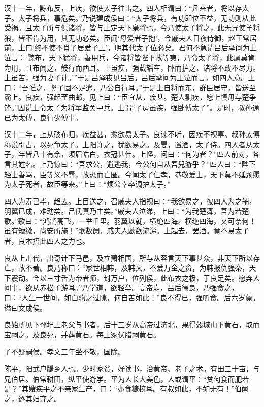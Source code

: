 \documentclass[12pt,UTF8]{ctexbook}
\begin{document}
汉十一年，黥布反，上疾，欲使太子往击之。四人相谓曰：“凡来者，将以存太子。太子将兵，事危矣。”乃说建成侯曰：“太子将兵，有功即位不益，无功则从此受祸。且太子所与俱诸将，皆与上定天下枭将也，今乃使太子将之，此无异使羊将狼，皆不肯为用，其无功必矣。臣闻‘母爱者子抱’，今戚夫人日夜侍御，赵王常居前，上曰‘终不使不肖子居爱子上’，明其代太子位必矣。君何不急请吕后承间为上泣言：‘黥布，天下猛将，善用兵，今诸将皆陛下故等夷，乃令太子将，此属莫肯为用，且布闻之，鼓行而西耳。上虽疾，强载辎车，卧而护之，诸将不敢不尽力。上虽苦，强为妻子计。’”于是吕泽夜见吕后。吕后承间为上泣而言，如四人意。上曰：“吾惟之，竖子固不足遣，乃公自行耳。”于是上自将而东，群臣居守，皆送至霸上。良疾，强起至曲邮，见上曰：“臣宜从，疾甚。楚人剽疾，愿上慎毋与楚争锋。”因说上令太子为将军监关中兵。上谓“子房虽疾，强卧傅太子”。是时，叔孙通已为太傅，良行少傅事。



汉十二年，上从破布归，疾益甚，愈欲易太子。良谏不听，因疾不视事。叔孙太傅称说引古，以死争太子。上阳许之，犹欲易之。及晏，置酒，太子侍。四人者从太子，年皆八十有余，须眉皓白，衣冠甚伟。上怪，问曰：“何为者？”四人前对，各言其姓名。上乃惊曰：“吾求公，避逃我，今公何自从吾兒游乎？”四人曰：“陛下轻士善骂，臣等义不辱，故恐而亡匿。今闻太子仁孝，恭敬爱士，天下莫不延颈愿为太子死者，故臣等来。”上曰：“烦公幸卒调护太子。”



四人为寿已毕，趋去。上目送之，召戚夫人指视曰：“我欲易之，彼四人为之辅，羽翼已成，难动矣。吕氏真乃主矣。”戚夫人泣涕，上曰：“为我楚舞，吾为若楚歌。”歌曰：“鸿鹄高飞，一举千里。羽翼以就，横绝四海。横绝四海，又可奈何！虽有矰缴，尚安所施！”歌数阕，戚夫人歔欷流涕。上起去，罢酒。竟不易太子者，良本招此四人之力也。



良从上击代，出奇计下马邑，及立萧相国，所与从容言天下事甚众，非天下所以存亡，故不著。良乃称曰：“家世相韩，及韩灭，不爱万金之资，为韩报仇强秦，天下震动。今以三寸舌为帝者师，封万户，位列侯，此布衣之极，于良足矣。愿弃人间事，欲从赤松子游耳。”乃学道，欲轻举。高帝崩，吕后德良，乃强食之，曰：“人生一世间，如白驹之过隙，何自苦如此！”良不得已，强听食。后六岁薨。谥曰文成侯。



良始所见下邳圯上老父与书者，后十三岁从高帝过济北，果得穀城山下黄石，取而宝祠之。及良死，并葬黄石。每上冢伏腊祠黄石。



子不疑嗣侯。孝文三年坐不敬，国除。



陈平，阳武户牖乡人也。少时家贫，好读书，治黄帝、老子之术。有田三十亩，与兄伯居。伯常耕田，纵平使游学。平为人长大美色，人或谓平：“贫何食而肥若是？”其嫂疾平之不亲家生产，曰：“亦食糠核耳。有叔如此，不如无有！”伯闻之，逐其妇弃之。
\end{document}
